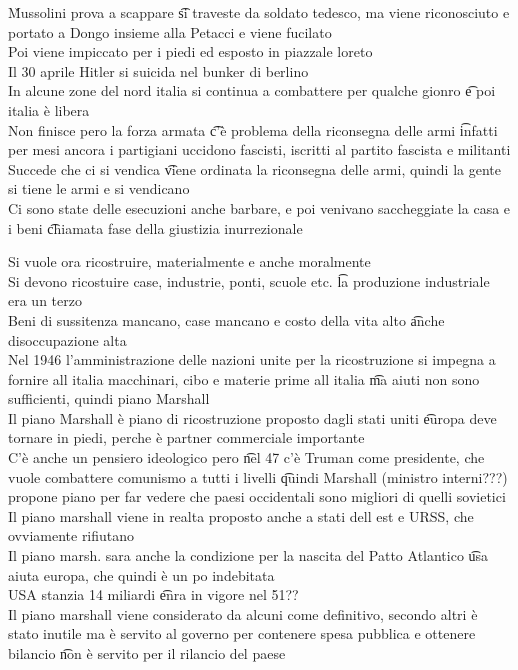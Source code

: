 \documentclass[12pt]{article}
\begin{document}
\v

Mussolini prova a scappare \t si traveste da soldato tedesco, ma viene riconosciuto e portato a Dongo insieme alla Petacci e viene fucilato \\
Poi viene impiccato per i piedi ed esposto in piazzale loreto \\
Il 30 aprile Hitler si suicida nel bunker di berlino \\
In alcune zone del nord italia si continua a combattere per qualche gionro \t e poi italia è libera \\
Non finisce pero la forza armata \t c'è problema della riconsegna delle armi \t infatti per mesi ancora i partigiani uccidono fascisti, iscritti al partito fascista e militanti \\
Succede che ci si vendica \t viene ordinata la riconsegna delle armi, quindi la gente si tiene le armi e si vendicano \\
Ci sono state delle esecuzioni anche barbare, e poi venivano saccheggiate la casa e i beni \t chiamata fase della giustizia inurrezionale

\s[Ricostruzione]
Si vuole ora ricostruire, materialmente e anche moralmente \\
Si devono ricostuire case, industrie, ponti, scuole etc. \t la produzione industriale era un terzo \\
Beni di sussitenza mancano, case mancano e costo della vita alto \t anche disoccupazione alta \\
Nel 1946 l'amministrazione delle nazioni unite per la ricostruzione si impegna a fornire all italia macchinari, cibo e materie prime all italia \t ma aiuti non sono sufficienti, quindi piano Marshall \\
Il piano Marshall è piano di ricostruzione proposto dagli stati uniti \t europa deve tornare in piedi, perche è partner commerciale importante \\
C'è anche un pensiero ideologico pero \t nel 47 c'è Truman come presidente, che vuole combattere comunismo a tutti i livelli \t quindi Marshall (ministro interni???) propone piano per far vedere che paesi occidentali sono migliori di quelli sovietici \\
Il piano marshall viene in realta proposto anche a stati dell est e URSS, che ovviamente rifiutano \\
Il piano marsh. sara anche la condizione per la nascita del Patto Atlantico \t usa aiuta europa, che quindi è un po indebitata \\
USA stanzia 14 miliardi \t enra in vigore nel 51?? \\
Il piano marshall viene considerato da alcuni come definitivo, secondo altri è stato inutile ma è servito al governo per contenere spesa pubblica e ottenere bilancio \t non è servito per il rilancio del paese
\end{document}
